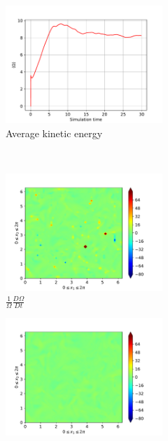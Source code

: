 \begin{figure}[H]
    \begin{subfigure}[H]{0.45\textwidth}
        \includegraphics[height=1.75in]{media/run-cds-65/enst-average1340}
        \caption{Average kinetic energy}
    \end{subfigure}
    ~
    \begin{subfigure}[H]{0.45\textwidth}
        \includegraphics[height=1.75in]{media/run-cds-65/enst-1340}
        \caption{$\frac{1}{\Omega} \frac{D \Omega}{Dt}$}
    \end{subfigure}
    \newline
    \begin{subfigure}{0.45\textwidth}
        \includegraphics[height=1.75in]{media/run-cds-65/A-enst-1340}

\end{subfigure}
\end{figure}
